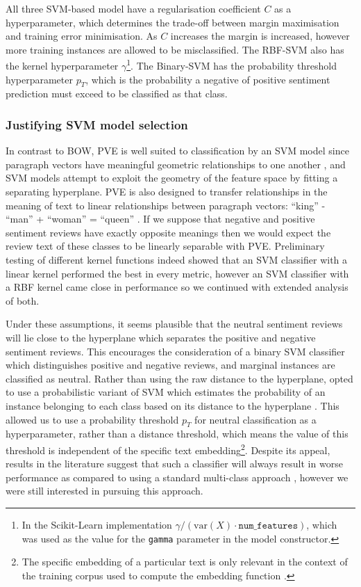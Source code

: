 \documentclass[11pt]{article}
\begin{document}
All three SVM-based model have a regularisation coefficient $C$ as a hyperparameter, which determines the trade-off between margin maximisation and training error minimisation. As $C$ increases the margin is increased, however more training instances are allowed to be misclassified. The RBF-SVM also has the kernel hyperparameter $\gamma$\footnote{In the Scikit-Learn implementation $\gamma/(\textrm{var}(X) \cdot \texttt{num\_features} )$, which was used as the value for the \texttt{gamma} parameter in the model constructor.}. The Binary-SVM has the probability threshold hyperparameter $p_T$, which is the probability a negative of positive sentiment prediction must exceed to be classified as that class.

\subsubsection*{Justifying SVM model selection}
In contrast to BOW, PVE is well suited to classification by an SVM model since paragraph vectors have meaningful geometric relationships to one another \cite{le_distributed_2014}, and SVM models attempt to exploit the geometry of the feature space by fitting a separating hyperplane. PVE is also designed to transfer relationships in the meaning of text to linear relationships between paragraph vectors: ``king'' - ``man'' + ``woman'' = ``queen'' \cite{le_distributed_2014}. If we suppose that negative and positive sentiment reviews have exactly opposite meanings then we would expect the review text of these classes to be linearly separable with PVE. Preliminary testing of different kernel functions indeed showed that an SVM classifier with a linear kernel performed the best in every metric, however an SVM classifier with a RBF kernel came close in performance so we continued with extended analysis of both.

Under these assumptions, it seems plausible that the neutral sentiment reviews will lie close to the hyperplane which separates the positive and negative sentiment reviews. This encourages the consideration of a binary SVM classifier which distinguishes positive and negative reviews, and marginal instances are classified as neutral. Rather than using the raw distance to the hyperplane, opted to use a probabilistic variant of SVM which estimates the probability of an instance belonging to each class based on its distance to the hyperplane \cite{platt_probabilistic_1999}. This allowed us to use a probability threshold $p_T$ for neutral classification as a hyperparameter, rather than a distance threshold, which means the value of this threshold is independent of the specific text embedding\footnote{The specific embedding of a particular text is only relevant in the context of the training corpus used to compute the embedding function \cite{le_distributed_2014}.}. Despite its appeal, results in the literature suggest that such a classifier will always result in worse performance as compared to using a standard multi-class approach \cite{koppel_importance_2006}, however we were still interested in pursuing this approach.
\end{document}
